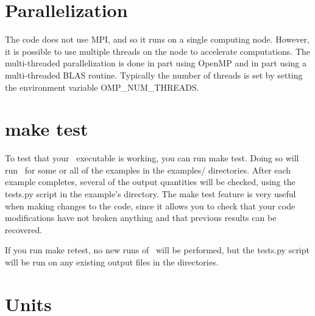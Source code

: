 \section{Parallelization}

The code does not use {\ttfamily MPI}, and so it runs on a single computing node.  However, it is possible to use multiple threads
on the node to accelerate computations.  The multi-threaded parallelization is done in part using {\ttfamily OpenMP}
and in part using a multi-threaded {\ttfamily BLAS} routine. Typically the number of threads is set by
setting the environment variable {\ttfamily OMP\_NUM\_THREADS}.


\section{\ttfamily make test}

To test that your \regcoil~executable is working, you can run {\ttfamily make test}.  Doing so will run
\regcoil~for some or all of the examples in the {\ttfamily examples/} directories.
After each example completes, several of the output quantities
will be checked, using the
{\ttfamily tests.py} script in the example's directory.
The {\ttfamily make test} feature is very useful when making changes to the code, since it allows you to check
that your code modifications have not broken anything and that previous results
can be recovered.

If you run {\ttfamily make retest},
no new runs of \regcoil~will be performed, but the {\ttfamily tests.py} script
will be run on any existing output files in the  directories.

\section{Units}

